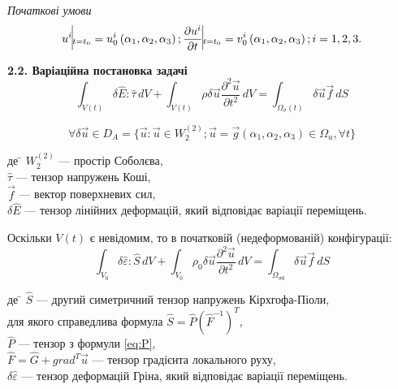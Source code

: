 \documentclass[10pt,a4paper]{article}
\numberwithin{figure}{section}
\numberwithin{equation}{section}
\begin{document}
\emph{Початкові умови}
\begin{equation}
u^{i}\vline _{t=t_0} = u^i_0 \left( \alpha_1, \alpha_2, \alpha_3 \right); \frac{\partial u^{i}}{\partial t}\vline _{t=t_0} =v^i_0 \left( \alpha_1, \alpha_2, \alpha_3 \right); i=1,2,3.
\end{equation}

\textbf{2.2. Варіаційна постановка задачі}
\begin{equation}
\int_{V(t)} \delta\hat{E}:\hat{\tau}\,dV+\int_{V(t)} \rho \delta\vec{u} \frac{\partial^2 \vec{u}}{\partial t ^2}\,dV=\int_{\Omega_\sigma(t)} \delta\vec{u} \vec{f} \,dS
\end{equation}

\[
\forall \delta\vec{u} \in D_A 
= \{ 
\vec{u}:\vec{u}\in W_2^{(2)}; 
\vec{u}=\vec{g} \left( \alpha_1, \alpha_2,\alpha_3 \right) \in \Omega_{u}, \forall t \}
\]

\begin{tabbing}
де \= $ W_2^{(2)}$ --- простір Соболєва,\\
\> $\hat{\tau}$ --- тензор напружень Коші,\\
\> $\vec{f}$ --- вектор поверхневих сил,\\
\> $\delta\hat{E}$ --- тензор лінійних деформацій, який відповідає варіації переміщень.
\end{tabbing}
Оскільки $V(t)$ є невідомим, то в початковій (недеформованій) конфігурації:
\begin{equation}\label{eq:virtwork_gen}
\int_{V_0} \delta\hat{\varepsilon}:\hat{S}\,dV+\int_{V_0} \rho_0 \delta\vec{u} \frac{\partial^2 \vec{u}}{\partial t ^2}\,dV=\int_{\Omega_{\sigma0}} \delta\vec{u} \vec{f} \,dS
\end{equation}

\begin{tabbing}
де \= $\hat{S}$ --- другий симетричний тензор напружень Кірхгофа-Піоли, \\для якого справедлива формула $\hat{S} = \hat{P} \left( \hat{F}^{-1} \right)^T $,\\
\> $\hat{P}$ --- тензор з формули \ref{eq:P},\\
\> $\hat{F}=\hat{G} + grad^T \vec{u}$ --- тензор градієнта локального руху,\\
\> $\delta\hat{\varepsilon}$ --- тензор деформацій Гріна, який відповідає варіації переміщень.
\end{tabbing}
\end{document}
